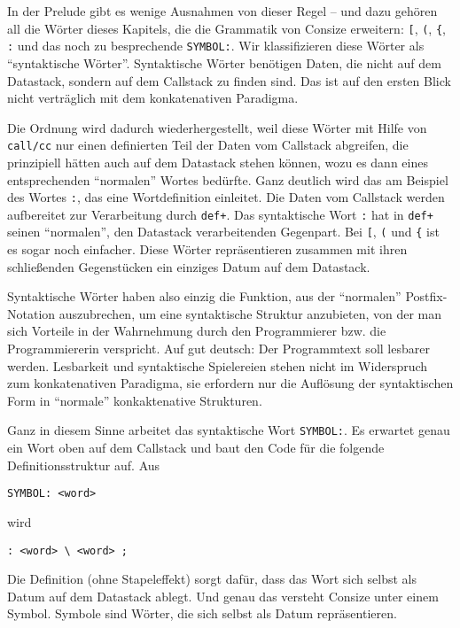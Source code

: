 In der Prelude gibt es wenige Ausnahmen von dieser Regel -- und dazu gehören all die Wörter dieses Kapitels, die die Grammatik von Consize erweitern: \verb|[|, \verb|(|, \verb|{|, \verb|:| und das noch zu besprechende \verb|SYMBOL:|. Wir klassifizieren diese Wörter als "`syntaktische Wörter"'. Syntaktische Wörter benötigen Daten, die nicht auf dem Datastack, sondern auf dem Callstack zu finden sind. Das ist auf den ersten Blick nicht verträglich mit dem konkatenativen Paradigma.

Die Ordnung wird dadurch wiederhergestellt, weil diese Wörter mit Hilfe von \verb|call/cc| nur einen definierten Teil der Daten vom Callstack abgreifen, die prinzipiell hätten auch auf dem Datastack stehen können, wozu es dann eines entsprechenden "`normalen"' Wortes bedürfte. Ganz deutlich wird das am Beispiel des Wortes \verb|:|, das eine Wortdefinition einleitet. Die Daten vom Callstack werden aufbereitet zur Verarbeitung durch \verb|def+|. Das syntaktische Wort \verb|:| hat in \verb|def+| seinen "`normalen"', den Datastack verarbeitenden Gegenpart. Bei \verb|[|, \verb|(| und \verb|{| ist es sogar noch einfacher. Diese Wörter repräsentieren zusammen mit ihren schließenden Gegenstücken ein einziges Datum auf dem Datastack.

Syntaktische Wörter haben also einzig die Funktion, aus der "`normalen"' Postfix-Notation auszubrechen, um eine syntaktische Struktur anzubieten, von der man sich Vorteile in der Wahrnehmung durch den Programmierer bzw. die Programmiererin verspricht. Auf gut deutsch: Der Programmtext soll lesbarer werden. Lesbarkeit und syntaktische Spielereien stehen nicht im Widerspruch zum konkatenativen Paradigma, sie erfordern nur die Auflösung der syntaktischen Form in "`normale"' konkaktenative Strukturen.

Ganz in diesem Sinne arbeitet das syntaktische Wort \verb|SYMBOL:|. Es erwartet genau ein Wort oben auf dem Callstack und baut den Code für die folgende Definitionsstruktur auf. Aus

\begin{verbatim}
SYMBOL: <word>
\end{verbatim}

wird

\begin{verbatim}
: <word> \ <word> ;
\end{verbatim}

Die Definition (ohne Stapeleffekt) sorgt dafür, dass das Wort sich selbst als Datum auf dem Datastack ablegt. Und genau das versteht Consize unter einem Symbol. Symbole sind Wörter, die sich selbst als Datum repräsentieren.

